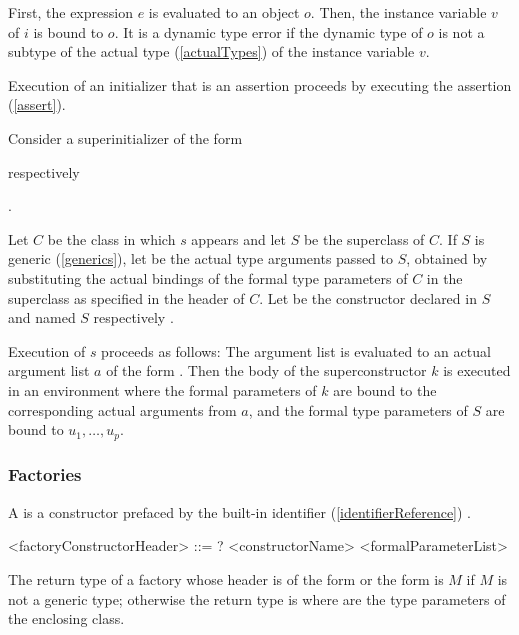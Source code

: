 \documentclass[makeidx]{article}
\begin{document}
\LMHash{}%
First, the expression $e$ is evaluated to an object $o$.
Then, the instance variable $v$ of $i$ is bound to $o$.
It is a dynamic type error if the dynamic type of $o$ is not
a subtype of the actual type
(\ref{actualTypes})
of the instance variable $v$.

\LMHash{}%
Execution of an initializer that is an assertion proceeds by
executing the assertion (\ref{assert}).

\LMHash{}%
Consider a superinitializer  of the form

\noindent
\code{\SUPER(\ArgumentListStd)}
respectively

\noindent
{}.

\LMHash{}%
%
Let $C$ be the class in which $s$ appears and let $S$ be the superclass of $C$.
If $S$ is generic (\ref{generics}),
let  be the actual type arguments passed to $S$,
obtained by substituting the actual bindings 
of the formal type parameters of $C$
in the superclass as specified in the header of $C$.
Let  be the constructor declared in $S$ and named
$S$ respectively .

\LMHash{}%
Execution of $s$ proceeds as follows:
The argument list
\code{(\ArgumentListStd)}
is evaluated to an actual argument list $a$ of the form
.
Then the body of the superconstructor $k$ is executed
in an environment where the formal parameters of $k$ are bound to
the corresponding actual arguments from $a$,
and the formal type parameters of $S$ are bound to $u_1, \ldots, u_p$.


\subsubsection{Factories}

\LMHash{}%
A 
is a constructor prefaced by the built-in identifier
(\ref{identifierReference})
\FACTORY.

\begin{grammar}
<factoryConstructorHeader> ::= \gnewline{}
  \CONST? \FACTORY{} <constructorName> <formalParameterList>
\end{grammar}

\LMHash{}%
The return type of a factory whose header is of
the form  or
the form 
is $M$ if $M$ is not a generic type;
otherwise the return type is
where  are the type parameters of the enclosing class.
\end{document}
